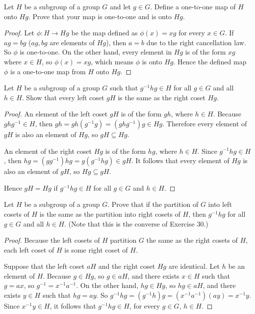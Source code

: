\begin{exercise}
    Let $H$ be a subgroup of a group $G$ and let $g\in G$. Define a one-to-one map of $H$ onto $Hg$. Prove that your map is one-to-one and is onto $Hg$.
\end{exercise}

\begin{proof}
    Let $\phi: H\to Hg$ be the map defined as $\phi(x) = xg$ for every $x\in G$. If $ag = bg$ ($ag, bg$ are elements of $Hg$), then $a = b$ due to the right cancellation law. So $\phi$ is one-to-one. On the other hand, every element in $Hg$ is of the form $xg$ where $x\in H$, so $\phi(x) = xg$, which means $\phi$ is onto $Hg$. Hence the defined map $\phi$ is a one-to-one map from $H$ onto $Hg$.
\end{proof}

\begin{exercise}
    Let $H$ be a subgroup of a group $G$ such that $g^{-1}hg\in H$ for all $g\in G$ and all $h\in H$. Show that every left coset $gH$ is the same as the right coset $Hg$.
\end{exercise}

\begin{proof}
    An element of the left coset $gH$ is of the form $gh$, where $h\in H$. Because $ghg^{-1}\in H$, then $gh = gh(g^{-1}g) = (ghg^{-1})g \in Hg$. Therefore every element of $gH$ is also an element of $Hg$, so $gH \subseteq Hg$.

    An element of the right coset $Hg$ is of the form $hg$, where $h\in H$. Since $g^{-1}hg\in H$, then $hg = (gg^{-1})hg = g(g^{-1}hg)\in gH$. It follows that every element of $Hg$ is also an element of $gH$, so $Hg \subseteq gH$.

    Hence $gH = Hg$ if $g^{-1}hg\in H$ for all $g\in G$ and $h\in H$.
\end{proof}

\begin{exercise}
    Let $H$ be a subgroup of a group $G$. Prove that if the partition of $G$ into left cosets of $H$ is the same as the partition into right cosets of $H$, then $g^{-1}hg$ for all $g\in G$ and all $h\in H$. (Note that this is the converse of Exercise 30.)
\end{exercise}

\begin{proof}
    Because the left cosets of $H$ partition $G$ the same as the right cosets of $H$, each left coset of $H$ is some right coset of $H$.

    Suppose that the left coset $aH$ and the right coset $Hg$ are identical. Let $h$ be an element of $H$. Because $g\in Hg$, so $g\in aH$, and there exists $x\in H$ such that $g = ax$, so $g^{-1} = x^{-1}a^{-1}$. On the other hand, $hg\in Hg$, so $hg\in aH$, and there exists $y\in H$ such that $hg = ay$. So $g^{-1}hg = (g^{-1}h)g = (x^{-1}a^{-1})(ay) = x^{-1}y$. Since $x^{-1}y\in H$, it follows that $g^{-1}hg\in H$, for every $g\in G$, $h\in H$.
\end{proof}

